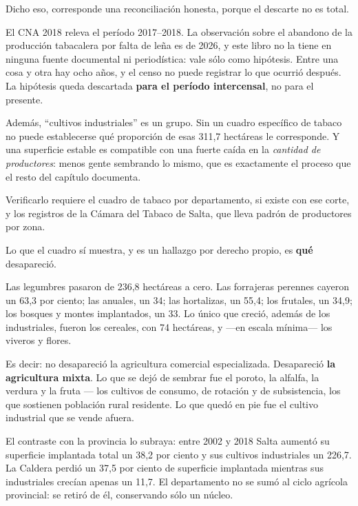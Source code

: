 \begin{cautela}
Dicho eso, corresponde una reconciliación honesta, porque el descarte no es total.

El CNA 2018 releva el período 2017--2018. La observación sobre el abandono de la producción tabacalera por falta de leña es de 2026, y este libro no la tiene en ninguna fuente documental ni periodística: vale sólo como hipótesis. Entre una cosa y otra hay ocho años, y el censo no puede registrar lo que ocurrió después. La hipótesis queda descartada \textbf{para el período intercensal}, no para el presente.

Además, ``cultivos industriales'' es un grupo. Sin un cuadro específico de tabaco no puede establecerse qué proporción de esas 311,7 hectáreas le corresponde. Y una superficie estable es compatible con una fuerte caída en la \textit{cantidad de productores}: menos gente sembrando lo mismo, que es exactamente el proceso que el resto del capítulo documenta.

Verificarlo requiere el cuadro de tabaco por departamento, si existe con ese corte, y los registros de la Cámara del Tabaco de Salta, que lleva padrón de productores por zona.
\end{cautela}

Lo que el cuadro sí muestra, y es un hallazgo por derecho propio, es \textbf{qué} desapareció.

Las legumbres pasaron de 236,8 hectáreas a cero. Las forrajeras perennes cayeron un 63,3 por ciento; las anuales, un 34; las hortalizas, un 55,4; los frutales, un 34,9; los bosques y montes implantados, un 33. Lo único que creció, además de los industriales, fueron los cereales, con 74 hectáreas, y ---en escala mínima--- los viveros y flores.

Es decir: no desapareció la agricultura comercial especializada. Desapareció \textbf{la agricultura mixta}. Lo que se dejó de sembrar fue el poroto, la alfalfa, la verdura y la fruta --- los cultivos de consumo, de rotación y de subsistencia, los que sostienen población rural residente. Lo que quedó en pie fue el cultivo industrial que se vende afuera.

El contraste con la provincia lo subraya: entre 2002 y 2018 Salta aumentó su superficie implantada total un 38,2 por ciento y sus cultivos industriales un 226,7. La Caldera perdió un 37,5 por ciento de superficie implantada mientras sus industriales crecían apenas un 11,7. El departamento no se sumó al ciclo agrícola provincial: se retiró de él, conservando sólo un núcleo.


